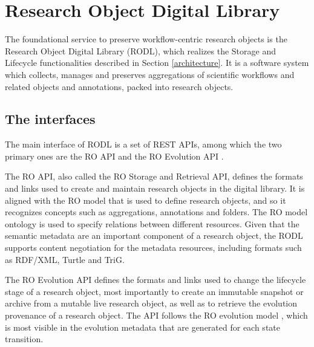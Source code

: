 \section{Research Object Digital Library}
\label{sec:rodl}


The foundational service to preserve workflow-centric research objects is the Research Object Digital Library (RODL), which realizes the Storage and Lifecycle functionalities described in Section \ref{architecture}. It is a software system which collects, manages and preserves aggregations of scientific workflows and related objects and annotations, packed into research objects.



\subsection{The interfaces}

The main interface of RODL is a set of REST APIs, among which the two primary ones are the RO API \cite{RO-API} and the RO Evolution API \cite{RO-EVO-API}.

The RO API, also called the RO Storage and Retrieval API, defines the formats and links used to create and maintain research objects in the digital library. It is aligned with the RO model that is used to define research objects, and so it recognizes concepts such as aggregations, annotations and folders. The RO model ontology \cite{RO_model} is used to specify relations between different resources. Given that the semantic metadata are an important component of a research object, the RODL supports content negotiation for the metadata resources, including formats such as RDF/XML, Turtle and TriG.

The RO Evolution API defines the formats and links used to change the lifecycle stage of a research object, most importantly to create an immutable snapshot or archive from a mutable live research object, as well as to retrieve the evolution provenance of a research object. The API follows the RO evolution model \cite{w4fever_d321}, which is most visible in the evolution metadata that are generated for each state transition.

